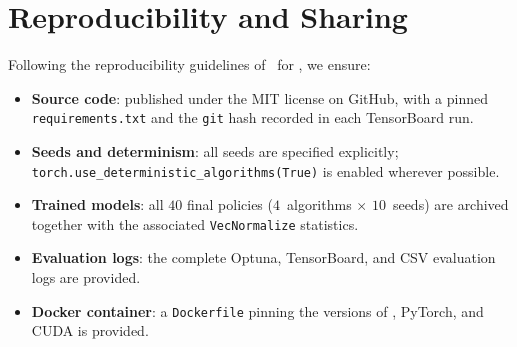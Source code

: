 \section{Reproducibility and Sharing}
\label{sec:reproducibility}

Following the reproducibility guidelines of~\parencite{Pineau2021} for \RL{},
we ensure:
\begin{itemize}
  \item \textbf{Source code}: published under the MIT license on GitHub, with a
        pinned \texttt{requirements.txt} and the \texttt{git} hash recorded in each
        TensorBoard run.
  \item \textbf{Seeds and determinism}: all seeds are specified explicitly;
        \texttt{torch.use\_deterministic\_algorithms(True)} is enabled wherever
        possible.
  \item \textbf{Trained models}: all $40$ final policies
        ($4$~algorithms $\times$ $10$~seeds) are archived together with the
        associated \texttt{VecNormalize} statistics.
  \item \textbf{Evaluation logs}: the complete Optuna, TensorBoard, and CSV
        evaluation logs are provided.
  \item \textbf{Docker container}: a \texttt{Dockerfile} pinning the versions of
        \MuJoCo{}, PyTorch, and CUDA is provided.
\end{itemize}
